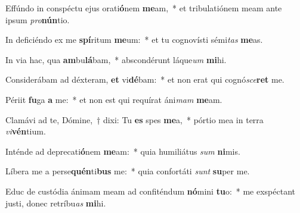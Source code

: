 \item Effúndo in conspéctu ejus orati\textbf{ó}nem \textbf{me}am,~* et tribulatiónem meam ante ipsum \textit{pro}\textbf{nún}tio.
\item In deficiéndo ex me \textbf{spí}ritum \textbf{me}um:~* et tu cognovísti sémi\textit{tas} \textbf{me}as.
\item In via hac, qua \textbf{am}bu\textbf{lá}bam,~* abscondérunt láque\textit{um} \textbf{mi}hi.
\item Considerábam ad déxteram, \textbf{et} vi\textbf{dé}bam:~* et non erat qui cognó\textit{sce}\textbf{ret} me.
\item Périit \textbf{fu}ga \textbf{a} me:~* et non est qui requírat áni\textit{mam} \textbf{me}am.
\item Clamávi ad te, Dómine,~† dixi: Tu \textbf{es} spes \textbf{me}a,~* pórtio mea in terra \textit{vi}\textbf{vén}tium.
\item Inténde ad deprecati\textbf{ó}nem \textbf{me}am:~* quia humiliátus \textit{sum} \textbf{ni}mis.
\item Líbera me a perse\textbf{quén}ti\textbf{bus} me:~* quia confortáti \textit{sunt} \textbf{su}per me.
\item Educ de custódia ánimam meam ad confiténdum \textbf{nó}mini \textbf{tu}o:~* me exspéctant justi, donec retríbu\textit{as} \textbf{mi}hi.
